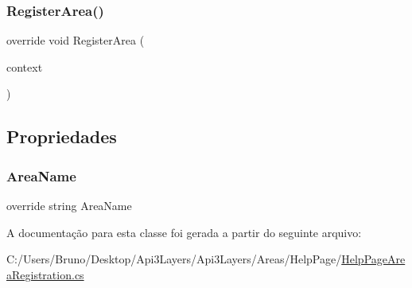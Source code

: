 \subsubsection{\texorpdfstring{Register\+Area()}{RegisterArea()}}
{\footnotesize\ttfamily override void Register\+Area (\begin{DoxyParamCaption}\item[{Area\+Registration\+Context}]{context }\end{DoxyParamCaption})}



\subsection{Propriedades}
\mbox{\label{classApi3Layers_1_1Areas_1_1HelpPage_1_1HelpPageAreaRegistration_acf6f429626f20687e61c64d5d5dd9f6d}} 
\subsubsection{\texorpdfstring{Area\+Name}{AreaName}}
{\footnotesize\ttfamily override string Area\+Name\hspace{0.3cm}{\ttfamily [get]}}



A documentação para esta classe foi gerada a partir do seguinte arquivo\+:\begin{DoxyCompactItemize}
\item 
C\+:/\+Users/\+Bruno/\+Desktop/\+Api3\+Layers/\+Api3\+Layers/\+Areas/\+Help\+Page/\hyperlink{HelpPageAreaRegistration_8cs}{Help\+Page\+Area\+Registration.\+cs}\end{DoxyCompactItemize}
